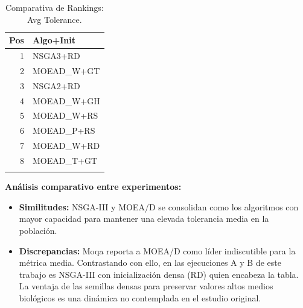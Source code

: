 \documentclass[a4paper,10pt]{article}
\begin{document}
\begin{table}[H]
\begin{minipage}[t]{0.32\textwidth}
        \begin{tabular}{rl}
            \toprule
            Pos & Algo+Init \\ \midrule
            1 & NSGA3+RD \\
            2 & MOEAD\_W+GT \\
            3 & NSGA2+RD \\
            4 & MOEAD\_W+GH \\
            5 & MOEAD\_W+RS \\
            6 & MOEAD\_P+RS \\
            7 & MOEAD\_W+RD \\
            8 & MOEAD\_T+GT \\
            \\
            \bottomrule
        \end{tabular}
    \end{minipage}
    \caption{Comparativa de Rankings: Avg Tolerance.}
\end{table}

\textbf{Análisis comparativo entre experimentos:}
\begin{itemize}
    \item \textbf{Similitudes:} NSGA-III y MOEA/D se consolidan como los algoritmos con mayor capacidad para mantener una elevada tolerancia media en la población.
    \item \textbf{Discrepancias:} Moqa reporta a MOEA/D como líder indiscutible para la métrica media. Contrastando con ello, en las ejecuciones A y B de este trabajo es NSGA-III con inicialización densa (RD) quien encabeza la tabla. La ventaja de las semillas densas para preservar valores altos medios biológicos es una dinámica no contemplada en el estudio original.
\end{itemize}
\end{document}
